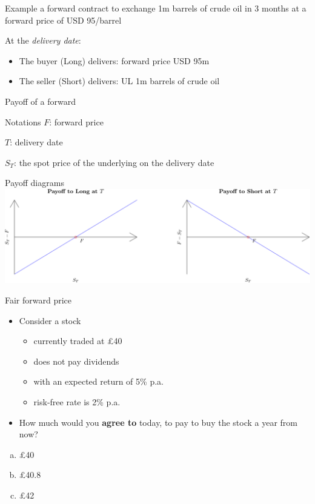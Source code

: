 \documentclass[
  ignorenonframetext,
  aspectratio=169]{beamer}
\providecommand{\tightlist}{%
  \setlength{\itemsep}{0pt}\setlength{\parskip}{0pt}}
\begin{document}
\begin{frame}
\begin{block}{Example}
\protect\hypertarget{example}{}
a forward contract to exchange 1m barrels of crude oil in 3 months at a
forward price of USD 95/barrel

At the \emph{delivery date}:

\begin{itemize}
\tightlist
\item
  The buyer (Long) delivers: forward price USD 95m
\item
  The seller (Short) delivers: UL 1m barrels of crude oil
\end{itemize}
\end{block}
\end{frame}

\begin{frame}{Payoff of a forward}
\protect\hypertarget{payoff-of-a-forward}{}
\begin{block}{Notations}
\protect\hypertarget{notations}{}
\(F\): forward price

\(T\): delivery date

\(S_T\): the spot price of the underlying on the delivery date
\end{block}

\begin{block}{Payoff diagrams}
\protect\hypertarget{payoff-diagrams}{}
\includegraphics{figure/unnamed-chunk-5-1.pdf}
\end{block}
\end{frame}

\begin{frame}{Fair forward price}
\protect\hypertarget{fair-forward-price}{}
\begin{itemize}
\item
  Consider a stock

  \begin{itemize}
  \tightlist
  \item
    currently traded at £40
  \item
    does not pay dividends
  \item
    with an expected return of 5\% p.a.
  \item
    risk-free rate is 2\% p.a.
  \end{itemize}
\item
  How much would you \textbf{agree to} today, to pay to buy the stock a
  year from now?
\end{itemize}

\begin{enumerate}
[(a)]
\tightlist
\item
  £40
\item
  £40.8
\item
  £42
\end{enumerate}
\end{frame}
\end{document}
